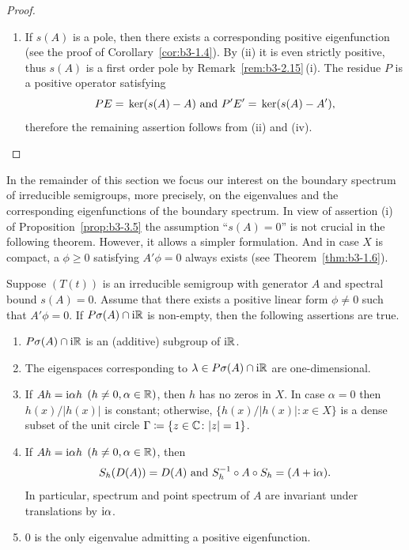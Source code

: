 \begin{proof}
\begin{enumerate}[\upshape (i), wide, labelindent=.25em]
	\item 
	If\/ $s(A)$ is a pole, then there exists a corresponding positive eigenfunction (see the proof of Corollary~\ref{cor:b3-1.4}).
	By (ii) it is even strictly positive, thus $s(A)$ is a first order pole by Remark~\ref{rem:b3-2.15}\,(i).
	The residue $P$ is a positive operator satisfying 
    \[
    PE = \mathop{}\mathrm{ker}(s(A) - A) \text{ and } P'E' = \mathop{}\mathrm{ker}(s(A) - A') , 
    \]
    therefore the remaining assertion follows from (ii) and (iv).
    \qedhere
	\end{enumerate}
	\end{proof}
In the remainder of this section we focus our interest on the boundary spectrum of irreducible semigroups, more precisely, on the eigenvalues and the corresponding eigenfunctions of the boundary spectrum. 
In view of assertion (i) of Proposition~\ref{prop:b3-3.5} the assumption \enquote{$s(A) = 0$} is not crucial in the following theorem. 
However, it allows a simpler formulation. 
And in case $X$ is compact, a $\phi \geq 0$ satisfying $A'\phi = 0$ always exists (see Theorem~\ref{thm:b3-1.6}).
\begin{theorem}\label{thm:b3-3.6}
%
	Suppose $(T(t))$ is an irreducible semigroup with generator $A$ and spectral bound $s(A) = 0$.
	Assume that there exists a positive linear form $\phi \neq 0$ such that $A'\phi = 0$. 
	If\/ $P\sigma(A)\cap \mathrm{i}\mathbb{R}$ is non-empty, then the following assertions are true.
	\begin{enumerate}[\upshape (i)]
		\item 
		$P\sigma(A)\cap \mathrm{i}\mathbb{R}$ is an (additive) subgroup of\/ $\mathrm{i} \mathbb{R}$.
	
		\item 
		The eigenspaces corresponding to $\lambda \in P\sigma(A)\cap \mathrm{i}\mathbb{R}$ are one-dimensional.
	
		\item 
		If\/ $Ah = \mathrm{i}\alpha h$ $(h \neq 0, \alpha \in \mathbb{R})$, then $h$ has no zeros in $X$.
		In case $\alpha = 0$ then $h(x)/|h(x)|$ is constant; otherwise, $\{h(x)/|h(x)| \colon x \in X\}$ is a dense subset of the unit circle\/ $\Gamma \coloneq \{z\in \mathbb{C} \colon |z|=1\}$.
	
		\item 
		If\/ $Ah = \mathrm{i}\alpha h$ $(h \neq 0, \alpha \in \mathbb{R})$, then
		\begin{equation}\label{eq:b3-3.5}
			S_{h}(D(A)) = D(A) \text{ and } S_{h}^{-1}\circ A \circ S_{h} = (A + \mathrm{i}\alpha).
		\end{equation}
		In particular, spectrum and point spectrum of\/ $A$ are invariant under translations by $\mathrm{i} \alpha$.
	
		\item 
		$0$ is the only eigenvalue admitting a positive eigenfunction.
	\end{enumerate}
\end{theorem}
